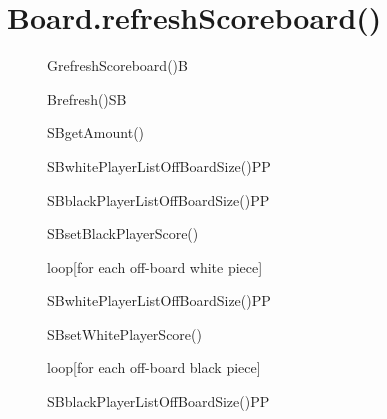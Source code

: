 \documentclass[8pt]{article}
\begin{document}
\section{Board.refreshScoreboard()}
\begin{figure}[H]
	\centering
  	\begin{adjustbox}{width=\textwidth}
		\begin{sequencediagram}
			      
			\begin{call}{G}{refreshScoreboard()}{B}{}	
				\begin{call}{B}{refresh()}{SB}{}
					\begin{callself}{SB}{getAmount()}{}
						\begin{call}{SB}{whitePlayerListOffBoardSize()}{PP}{}
						\end{call}
						\begin{call}{SB}{blackPlayerListOffBoardSize()}{PP}{}
						\end{call}
					\end{callself}
				
					\begin{callself}{SB}{setBlackPlayerScore()}{}
						\begin{sdblock}{loop}{[for each off-board white piece]}
							\begin{call}{SB}{whitePlayerListOffBoardSize()}{PP}{}
							\end{call}
						\end{sdblock}
					\end{callself}
					
					\begin{callself}{SB}{setWhitePlayerScore()}{}
						\begin{sdblock}{loop}{[for each off-board black piece]}
							\begin{call}{SB}{blackPlayerListOffBoardSize()}{PP}{}
							\end{call}
						\end{sdblock}
					\end{callself}
				\end{call}
			
			\end{call}
		
		
		
		\end{sequencediagram}
	\end{adjustbox}
\end{figure}
\end{document}
